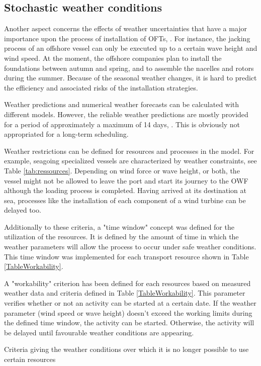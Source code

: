 \subsection{Stochastic weather conditions}
Another aspect concerns the effects of weather uncertainties that have a major importance upon the process of installation of OFTs, \cite{COMPIT11}. For instance, the jacking process of an offshore vessel can only be executed up to a certain wave height and wind speed. At the moment, the offshore companies plan to install the foundations between autumn and spring, and to assemble the nacelles and rotors during the summer. Because of the seasonal weather changes, it is hard to predict the efficiency and associated risks of the installation strategies.

Weather predictions and numerical weather forecasts can be calculated with different models. However, the reliable weather predictions are mostly provided for a period of approximately a maximum of 14 days, \cite{hinnenthal2007}. This is obviously not appropriated for a long-term scheduling.

Weather restrictions can be defined for resources and processes in the model. For example, seagoing specialized vessels are characterized by weather constraints, see Table \ref{tab:ressources}. Depending on wind force or wave height, or both, the vessel might not be allowed to leave the port and start its journey to the OWF although the loading process is completed. Having arrived at its destination at sea, processes like the installation of each component of a wind turbine can be delayed too.

Additionally to these criteria, a "time window" concept was defined for the utilization of the resources. It is defined by the amount of time in which the weather parameters will allow the process to occur under safe weather conditions. This time window was implemented for each transport resource shown in Table \ref{TableWorkability}.

A "workability" criterion has been defined for each resources based on measured weather data and criteria defined in Table \ref{TableWorkability}. This parameter verifies whether or not an activity can be started at a certain date. If the weather parameter (wind speed or wave height) doesn't exceed the working limits during the defined time window, the activity can be started. Otherwise, the activity will be delayed until favourable weather conditions are appearing.

\begin{table}[!hbp]
\caption{Criteria giving the weather conditions over which it is no longer possible to use certain resources}
\begin{center}

\end{center}
\label{TableWorkability}
\end{table}

